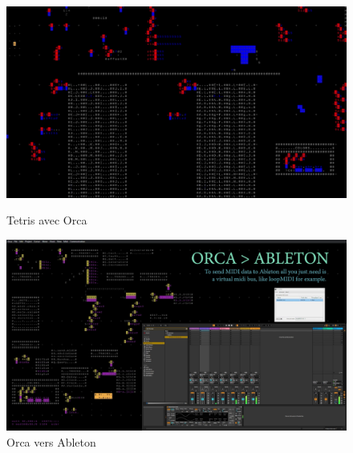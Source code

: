 \begin{figure}[h]
  \begin{minipage}[b]{0.45\linewidth}
    \centering
    \includegraphics[width=\linewidth]{images/experiments/tetris00.png}
    \caption{Tetris avec Orca}
    \label{tetris00}
  \end{minipage}
  \hspace{0.1\linewidth} %
  \begin{minipage}[b]{0.45\linewidth}
    \centering
    \includegraphics[width=\linewidth]{images/experiments/orca_ableton00.png}
    \caption{Orca vers Ableton}
    \label{orca_00}
  \end{minipage}
\end{figure}

